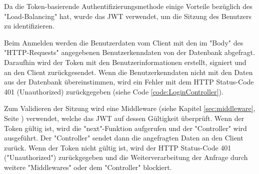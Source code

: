
Da die Token-basierende Authentifizierungsmethode einige Vorteile bezüglich des "Load-Balancing" hat, wurde das JWT verwendet, um die Sitzung des Benutzers zu identifizieren.



Beim Anmelden werden die Benutzerdaten vom Client mit den im "Body" des "HTTP-Requests" angegebenen Benutzerkenndaten von der Datenbank abgefragt. 
Daraufhin wird der Token mit den Benutzerinformationen erstellt, signiert und an den Client zurückgesendet. 
Wenn die Benutzerkenndaten nicht mit den Daten aus der Datenbank übereinstimmen, wird ein Fehler mit dem HTTP Status-Code 401 (Unauthorized) zurückgegeben (siehe Code \ref{code:LoginController}).


\pagebreak
{}

Zum Validieren der Sitzung wird eine Middleware (siehe Kapitel \ref{sec:middleware}, Seite \pageref{sec:middleware}) verwendet, welche das JWT auf dessen Gültigkeit überprüft. 
Wenn der Token gültig ist, wird die "next"-Funktion aufgerufen und der "Controller" wird ausgeführt. Der "Controller" sendet dann die angefragten Daten an den Client zurück. 
Wenn der Token nicht gültig ist, wird der HTTP Status-Code 401 ("Unauthorized") zurückgegeben und die Weiterverarbeitung der Anfrage durch weitere "Middlewares" oder dem "Controller" blockiert.

